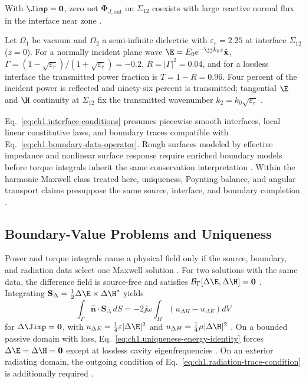 With \(\Jimp=\mathbf{0}\), zero net \(\boldsymbol{\Phi}_{J,\mathrm{out}}\) on \(\Sigma_{12}\) coexists with large reactive normal flux in the interface near zone \cite{stratton1941}.
\begin{example}
\label{ex:ch1.dielectric-interface}
Let \(\Omega_1\) be vacuum and \(\Omega_2\) a semi-infinite dielectric with \(\varepsilon_r=2.25\) at interface \(\Sigma_{12}\) (\(z=0\)). For a normally incident plane wave \(\E=E_0 e^{-\jj k_0 z}\hat{\mathbf{x}}\),
\(\Gamma=(1-\sqrt{\varepsilon_r})/(1+\sqrt{\varepsilon_r})=-0.2\),
\(R=|\Gamma|^2=0.04\), and for a lossless interface the transmitted power fraction is \(T=1-R=0.96\). Four percent of the incident power is reflected and ninety-six percent is transmitted; tangential \(\E\) and \(\H\) continuity at \(\Sigma_{12}\) fix the transmitted wavenumber \(k_2=k_0\sqrt{\varepsilon_r}\) \cite{stratton1941,jackson1999}.
\end{example}

Eq.~\eqref{eq:ch1.interface-conditions} presumes piecewise smooth interfaces,
local linear constitutive laws, and boundary traces compatible with
Eq.~\eqref{eq:ch1.boundary-data-operator}. Rough surfaces modeled by effective
impedance and nonlinear surface response
require enriched boundary models before torque integrals inherit the same conservation
interpretation \cite{stratton1941}. Within the harmonic Maxwell class treated here,
uniqueness, Poynting balance, and angular transport claims presuppose the same source, interface, and boundary completion \cite{maxwell1873}.

\subsection{Boundary-Value Problems and Uniqueness}
\label{sec:ch01.1.3}

Power and torque integrals name a physical field only if the source, boundary, and radiation data select one Maxwell solution \cite{stratton1941,sommerfeld1949}. For two solutions with the same data, the difference field is source-free and satisfies \(\mathcal{B}_\Gamma[\Delta\E,\Delta\H]=\mathbf{0}\) \cite{stratton1941}. Integrating \(\mathbf{S}_\Delta=\tfrac12\Delta\E\times\Delta\H^{*}\) yields
\begin{equation}
\label{eq:ch1.uniqueness-energy-identity}
\int_{\Gamma}\hat{\mathbf{n}}\cdot\mathbf{S}_\Delta\,dS
=-2\jj\omega\!\int_{\Omega}\!\left(u_{\Delta H}-u_{\Delta E}\right)dV
\end{equation}
for \(\Delta\Jimp=\mathbf{0}\), with \(u_{\Delta E}=\tfrac14\varepsilon|\Delta\E|^{2}\) and \(u_{\Delta H}=\tfrac14\mu|\Delta\H|^{2}\) \cite{stratton1941}. On a bounded passive domain with loss, Eq.~\eqref{eq:ch1.uniqueness-energy-identity} forces \(\Delta\E=\Delta\H=\mathbf{0}\) except at lossless cavity eigenfrequencies \cite{stratton1941,sommerfeld1949}. On an exterior radiating domain, the outgoing condition of Eq.~\eqref{eq:ch1.radiation-trace-condition} is additionally required \cite{sommerfeld1949,harrington2001}.
\label{prop:ch1.uniqueness-passive-closure}
\label{eq:ch1.uniqueness-condition-index}

